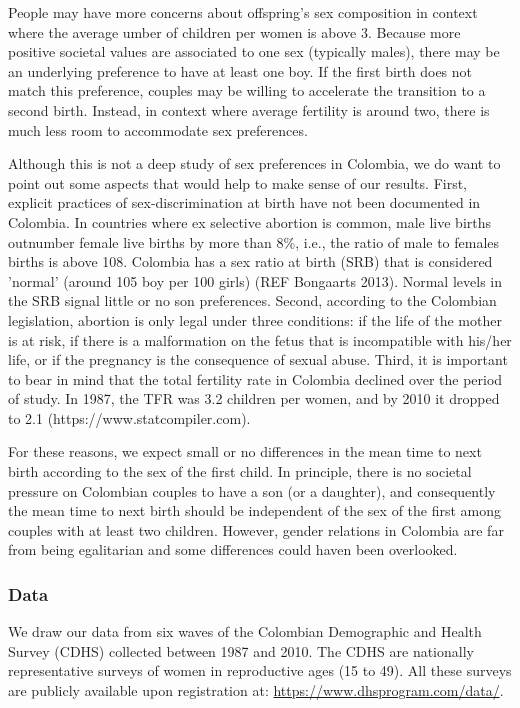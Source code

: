 \documentclass{article}
\begin{document}
  People may have more concerns about offspring's sex composition in context where the average umber of children per women is above 3. Because more positive societal values are associated to one sex (typically males), there may be an underlying preference to have at least one boy. If the first birth does not match this preference, couples may be willing to accelerate the transition to a second birth. Instead, in context where average fertility is around two, there is much less room to accommodate sex preferences.
  
 Although this is not a deep study of sex preferences in Colombia, we do want to point out some aspects that would help to make sense of our results. First, explicit practices of sex-discrimination at birth have not been documented in Colombia. In countries where ex selective abortion is common, male live births outnumber female live births by more than 8\%, i.e., the ratio of male to females births is above 108. Colombia has a sex ratio at birth (SRB) that is considered 'normal' (around 105 boy per 100 girls) (REF Bongaarts 2013). Normal levels in the SRB signal little or no son preferences. Second, according to the Colombian legislation, abortion is only legal under three conditions: if the life of the mother is at risk, if there is a malformation on the fetus that is incompatible with his/her life, or if the pregnancy is the consequence of sexual abuse. Third, it is important to bear in mind that the total fertility rate in Colombia declined  over the period of study. In 1987, the TFR was 3.2 children per women, and by 2010 it dropped to 2.1 (https://www.statcompiler.com).
 
  For these reasons, we expect small or no differences in the mean time to next birth according to the sex of the first child. In principle, there is no societal pressure on Colombian couples to have a son (or a daughter), and consequently the mean time to next birth should be independent of the sex of the first among couples with at least two children. However, gender relations in Colombia are far from being egalitarian and some differences could haven been overlooked.
 
 
\subsubsection{Data}

We draw our data from six waves of the Colombian Demographic and Health Survey (CDHS) collected between 1987 and 2010. The CDHS are nationally representative surveys of women in reproductive ages (15 to 49). All these surveys are publicly available upon registration at: \url{https://www.dhsprogram.com/data/}.
\end{document}
